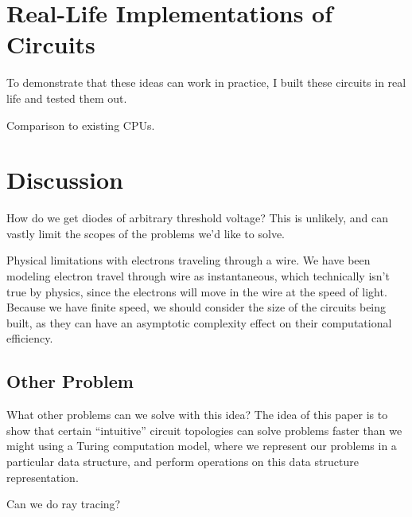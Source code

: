 \documentclass{article}
\begin{document}
\section{Real-Life Implementations of Circuits}

To demonstrate that these ideas can work in practice, I built these circuits
in real life and tested them out.

Comparison to existing CPUs.

\section{Discussion}

How do we get diodes of arbitrary threshold voltage?
This is unlikely, and can vastly limit the scopes of the problems we'd like
to solve.

Physical limitations with electrons traveling through a wire. We have been
modeling electron travel through wire as instantaneous, which technically
isn't true by physics, since the electrons will move in the wire at the speed
of light. Because we have finite speed, we should consider the size of the
circuits being built, as they can have an asymptotic complexity effect on
their computational efficiency.

\subsection{Other Problem}
What other problems can we solve with this idea?
The idea of this paper is to show that certain ``intuitive'' circuit
topologies can solve problems faster than we might using a Turing computation
model, where we represent our problems in a particular data structure, and
perform operations on this data structure representation.

Can we do ray tracing?




\end{document}
